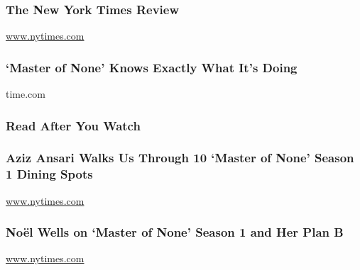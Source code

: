 \hypertarget{the-new-york-times-review}{%
\subsubsection{The New York Times
Review}\label{the-new-york-times-review}}

\href{http://www.nytimes.com}{www.nytimes.com}

\href{http://time.com/4111777/master-of-none-aziz-ansari-review/}{}

\hypertarget{master-of-none-knows-exactly-what-its-doing}{%
\subsubsection{`Master of None' Knows Exactly What It's
Doing}\label{master-of-none-knows-exactly-what-its-doing}}

time.com

\hypertarget{read-after-you-watch}{%
\subsubsection{Read After You Watch}\label{read-after-you-watch}}

\href{http://www.nytimes.com/interactive/2015/12/02/style/aziz-ansari-master-of-none-10-locations.html}{}

\hypertarget{aziz-ansari-walks-us-through-10-master-of-none-season-1-dining-spots}{%
\subsubsection{Aziz Ansari Walks Us Through 10 `Master of None' Season 1
Dining
Spots}\label{aziz-ansari-walks-us-through-10-master-of-none-season-1-dining-spots}}

\href{http://www.nytimes.com}{www.nytimes.com}

\href{http://www.nytimes.com/2015/11/22/arts/television/noel-wells-on-master-of-none-and-her-plan-b.html}{}

\hypertarget{nouxebl-wells-on-master-of-none-season-1-and-her-plan-b}{%
\subsubsection{Noël Wells on `Master of None' Season 1 and Her Plan
B}\label{nouxebl-wells-on-master-of-none-season-1-and-her-plan-b}}

\href{http://www.nytimes.com}{www.nytimes.com}

\href{http://www.nytimes.com/2015/11/15/arts/television/aziz-ansari-on-acting-race-and-hollywood.html}{}

